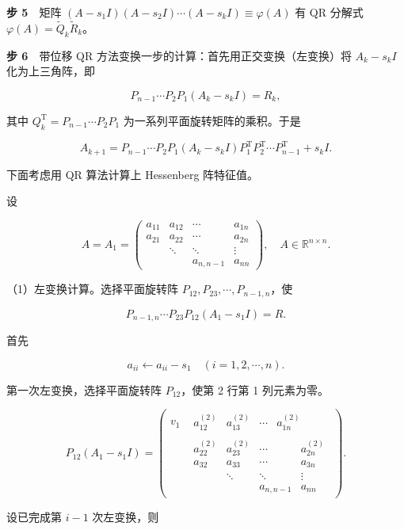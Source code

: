 \textbf{步 5}　矩阵 \((A-s_1I)(A-s_2I)\cdots(A-s_kI)\equiv\varphi(A)\) 有 QR 分解式 \(\varphi(A)=\widetilde Q_k\widetilde R_k\)。

\textbf{步 6}　带位移 QR 方法变换一步的计算：首先用正交变换（左变换）将 \(A_k-s_kI\) 化为上三角阵，即

\[
P_{n-1}\cdots P_2P_1(A_k-s_kI)=R_k,
\]

其中 \(Q_k^{\mathrm T}=P_{n-1}\cdots P_2P_1\) 为一系列平面旋转矩阵的乘积。于是

\[
A_{k+1}=P_{n-1}\cdots P_2P_1(A_k-s_kI)P_1^{\mathrm T}P_2^{\mathrm T}\cdots P_{n-1}^{\mathrm T}+s_kI.
\]

下面考虑用 QR 算法计算上 Hessenberg 阵特征值。

设

\[
A=A_1=\begin{pmatrix}
a_{11}&a_{12}&\cdots&a_{1n}\\
a_{21}&a_{22}&\cdots&a_{2n}\\
&\ddots&\ddots&\vdots\\
&&a_{n,n-1}&a_{nn}
\end{pmatrix},\quad A\in\mathbb R^{n\times n}.
\]

（1）左变换计算。选择平面旋转阵 \(P_{12},P_{23},\cdots,P_{n-1,n}\)，使

\[
P_{n-1,n}\cdots P_{23}P_{12}(A_1-s_1I)=R.
\]

首先

\[
a_{ii}\leftarrow a_{ii}-s_1\quad(i=1,2,\cdots,n).
\]

第一次左变换，选择平面旋转阵 \(P_{12}\)，使第 2 行第 1 列元素为零。

\[
P_{12}(A_1-s_1I)=\begin{pmatrix}
v_1&\begin{matrix}a_{12}^{(2)}&a_{13}^{(2)}&\cdots&a_{1n}^{(2)}\end{matrix}\\
&\boxed{\begin{matrix}
a_{22}^{(2)}&a_{23}^{(2)}&\cdots&a_{2n}^{(2)}\\
a_{32}&a_{33}&\cdots&a_{3n}\\
&\ddots&\ddots&\vdots\\
&&a_{n,n-1}&a_{nn}
\end{matrix}}
\end{pmatrix}.
\]

设已完成第 \(i-1\) 次左变换，则

